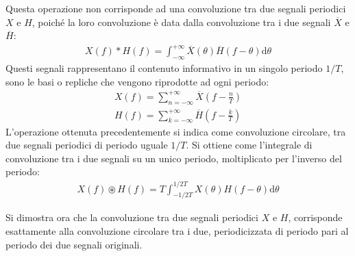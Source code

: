 \documentclass{article}
\newcommand{\df}{\mathrm{d}}
\numberwithin{equation}{subsection}
\begin{document}
Questa operazione non corrisponde ad una convoluzione tra due segnali periodici $X$ e $H$, poiché la loro convoluzione è data dalla 
convoluzione tra i due segnali $\overline{X}$ e $\overline{H}$:
\begin{gather*}
    {X}(f)*{H}(f)=\displaystyle\int_{-\infty}^{+\infty}\overline{X}(\theta)\overline{H}(f-\theta)\df\theta
\end{gather*}
Questi segnali rappresentano il contenuto informativo in un singolo periodo $1/T$, sono  le basi o repliche che vengono riprodotte ad ogni periodo:
\begin{gather*}
    X(f)=\displaystyle\sum_{n=-\infty}^{+\infty}\overline{X}\left(f-\frac{n}{T}\right)\\
    H(f)=\displaystyle\sum_{k=-\infty}^{+\infty}\overline{H}\left(f-\frac{k}{T}\right)
\end{gather*}
L'operazione ottenuta precedentemente si indica come convoluzione circolare, tra due segnali periodici di periodo uguale $1/T$. Si ottiene come l'integrale 
di convoluzione tra i due segnali su un unico periodo, moltiplicato per l'inverso del periodo:
\begin{gather*}
    X(f) \circledast H(f)=\displaystyle T\int_{-1/2T}^{1/2T}X(\theta)H(f-\theta)\df\theta
\end{gather*}

Si dimostra ora che la convoluzione tra due segnali periodici $X$ e $H$, corrisponde esattamente alla convoluzione circolare tra i due, 
periodicizzata di periodo pari al periodo dei due segnali originali. 
\end{document}
